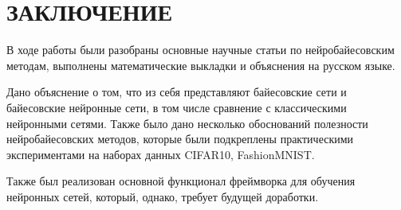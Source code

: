 \chapter*{ \large ЗАКЛЮЧЕНИЕ}
В ходе работы были разобраны основные научные статьи по нейробайесовским методам, выполнены математические выкладки и объяснения на русском языке.

Дано объяснение о том, что из себя представляют байесовские сети и байесовские нейронные сети, в том числе сравнение с классическими нейронными сетями.
 Также было дано несколько обоснований полезности нейробайесовских методов, которые были подкреплены практическими экспериментами на наборах данных CIFAR10, FashionMNIST.

Также был реализован основной функционал фреймворка для обучения нейронных сетей, который, однако, требует будущей доработки.
